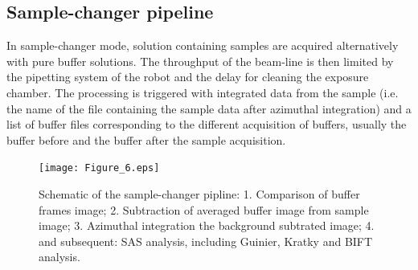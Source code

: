 \documentclass[preprint]{iucr}              %
\begin{document}





\subsection{Sample-changer pipeline}
\label{sc-pipeline}
In sample-changer mode, solution containing samples are acquired alternatively with pure buffer solutions.
The throughput of the beam-line is then limited by the pipetting system of the robot and the delay for cleaning the exposure chamber.  
The processing is triggered with integrated data from the sample (i.e. the name of the file containing the sample data after azimuthal integration) and a list of 
buffer files corresponding to the different acquisition of buffers, usually the buffer before and the buffer after the sample acquisition.

\begin{figure}
   \label{samplechanger_worflow}
   \texttt{[image: Figure\_6.eps]}
   \caption{Schematic of the sample-changer pipline: 
   1. Comparison of buffer frames image;
   2. Subtraction of averaged buffer image from sample image;
   3. Azimuthal integration the background subtrated image;
   4. and subsequent: SAS analysis, including Guinier, Kratky and BIFT analysis.}
\end{figure}
\end{document}
